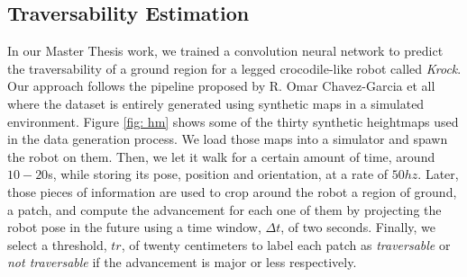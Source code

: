 \documentclass[twocolumn,showpacs,
  nofootinbib,aps,superscriptaddress,
  eqsecnum,prd,notitlepage,showkeys,10pt]{revtex4-1}
\begin{document}
\subsection{Traversability Estimation}
In our Master Thesis work, we trained a convolution neural network to predict the traversability of a ground region for a legged crocodile-like robot called \emph{Krock}. Our approach follows the pipeline proposed by R. Omar Chavez-Garcia et all \cite{omar} where the dataset is entirely generated using synthetic maps in a simulated environment. Figure \ref{fig: hm} shows some of the thirty synthetic heightmaps used in the data generation process. We load those maps into a simulator and spawn the robot on them. Then, we let it walk for a certain amount of time, around $10-20$s, while storing its pose, position and orientation, at a rate of $50hz$. Later, those pieces of information are used to crop around the robot a region of ground, a patch, and compute the advancement for each one of them by projecting the robot pose in the future using a time window, $\Delta t$, of two seconds. Finally, we select a threshold, $tr$, of twenty centimeters to label each patch as \emph{traversable} or \emph{not traversable} if the advancement is major or less respectively. 
\end{document}
